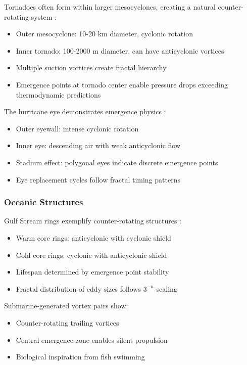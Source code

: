 \documentclass[12pt]{article}
\begin{document}
Tornadoes often form within larger mesocyclones, creating a natural counter-rotating system \cite{davies2004}:
\begin{itemize}
\item Outer mesocyclone: 10-20 km diameter, cyclonic rotation
\item Inner tornado: 100-2000 m diameter, can have anticyclonic vortices
\item Multiple suction vortices create fractal hierarchy
\item Emergence points at tornado center enable pressure drops exceeding thermodynamic predictions
\end{itemize}

The hurricane eye demonstrates emergence physics \cite{emanuel2003}:
\begin{itemize}
\item Outer eyewall: intense cyclonic rotation
\item Inner eye: descending air with weak anticyclonic flow
\item Stadium effect: polygonal eyes indicate discrete emergence points
\item Eye replacement cycles follow fractal timing patterns
\end{itemize}

\subsubsection{Oceanic Structures}

Gulf Stream rings exemplify counter-rotating structures \cite{olson1991}:
\begin{itemize}
\item Warm core rings: anticyclonic with cyclonic shield
\item Cold core rings: cyclonic with anticyclonic shield
\item Lifespan determined by emergence point stability
\item Fractal distribution of eddy sizes follows $3^{-n}$ scaling
\end{itemize}

Submarine-generated vortex pairs show:
\begin{itemize}
\item Counter-rotating trailing vortices
\item Central emergence zone enables silent propulsion
\item Biological inspiration from fish swimming
\end{itemize}
\end{document}
